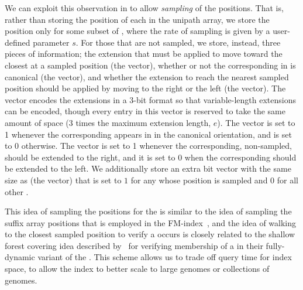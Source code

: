   We can exploit this observation in \pufferfish to allow \emph{sampling} of the \kmer
  positions. That is, rather than storing the position of each \kmer in the
  unipath array, we store the position only for some subset of \kmers, where the
  rate of sampling is given by a user-defined parameter $s$. For those \kmers
  that are not sampled, we store, instead, three pieces of information; the
  extension that must be applied to move toward the closest \kmer at a sampled
  position (the \qextvec vector), whether or not the corresponding \kmer in \cseq
  is canonical (the \canonvec vector), and whether the extension to reach the nearest
  sampled position should be applied by moving to the right or the left (the
  \extvec vector). The \qextvec vector encodes the extensions in a $3$-bit format so that
  variable-length extensions can be encoded, though every entry in this vector is reserved
  to take the same amount of space (3 times the maximum extension length, $e$).  The \canonvec vector
  is set to 1 whenever the corresponding \kmer appears in \cseq in the canonical orientation, and is
  set to 0 otherwise.  The \extvec vector is set to 1 whenever the corresponding, non-sampled, \kmer
  should be extended to the right, and it is set to 0 when the corresponding \kmer should be extended
  to the left. We additionally store an extra bit vector with the same size as
  \cseq (the \sampvec vector) that is set to $1$ for any \kmer whose position is
  sampled and $0$ for all other \kmers.

  This idea of sampling the positions for
  the \kmers is similar to the idea of sampling the suffix array positions that is
  employed in the FM-index~\citep{Ferragina2001Experimental}, and the idea of
  walking to the closest sampled position to verify a \kmer occurs is closely related to
  the shallow forest covering idea described by~\citet{belazzougui2016fully} for verifying membership of a \kmer in their fully-dynamic variant of the \dbg. This scheme allows us to trade off query time for index space, to allow the \pufferfish index to better scale to large genomes or collections of genomes.


